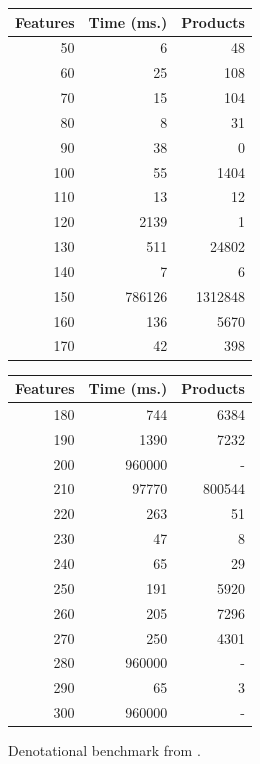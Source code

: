 \begin{figure}[t]
        \centering
        \begin{minipage}{0.4\hsize}
        \begin{tabular}{|rrr|}
                        \hline
                Features&       Time (ms.)&    Products\\
                        \hline
                50 & 6 & 48 \\
                60 & 25 & 108 \\
                70 & 15 & 104 \\
                80 & 8 & 31 \\
                90 & 38 & 0 \\
                100 & 55 & 1404 \\
                110 & 13 & 12 \\
                120 & 2139 & 1 \\
                130 & 511 & 24802 \\
                140 & 7 & 6 \\
                150 & 786126 & 1312848 \\
                160 & 136 & 5670 \\
                170 & 42 & 398 \\
                \hline
        \end{tabular}
        \end{minipage}
        \begin{minipage}{0.4\hsize}
        \begin{tabular}{|rrr|}
                \hline
                Features&       Time (ms.)&    Products\\
                        \hline
180 & 744 & 6384 \\
190 & 1390 & 7232 \\
200 & 960000 & - \\
210 & 97770 & 800544 \\
220 & 263 & 51 \\
230 & 47 & 8 \\
240 & 65 & 29 \\
250 & 191 & 5920 \\
260 & 205 & 7296 \\
270 & 250 & 4301 \\
280 & 960000 & - \\
290 & 65 & 3 \\
300 & 960000 & - \\
                \hline
        \end{tabular}
        \end{minipage}
        \caption{Denotational benchmark from \cite{acl13}.\label{figure:tool:den:benchmark}}
\end{figure}


